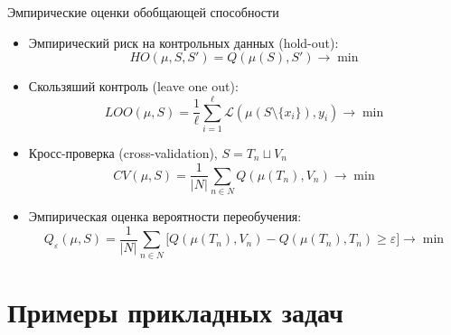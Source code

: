 \documentclass{beamer}
\begin{document}
\begin{frame}{Эмпирические оценки обобщающей способности}
\begin{itemize}
    \item Эмпирический риск на контрольных данных (hold-out):
    $$
        HO(\mu, S, S') = Q(\mu(S), S') \rightarrow \min
    $$
    \item Скользяший контроль (leave one out):
    $$
        LOO(\mu, S) = \frac{1}{\ell}\sum\limits_{i=1}^{\ell}\mathscr{L}(\mu(S\setminus \{x_i\}), y_i) \rightarrow \min
    $$
    \item Кросс-проверка (cross-validation), $S = T_n \sqcup V_n$
    $$
        CV(\mu, S) = \frac{1}{|N|}\sum\limits_{n \in N} Q(\mu(T_n), V_n) \rightarrow \min
    $$
    \item Эмпирическая оценка вероятности переобучения:
    $$
    Q_{\varepsilon}(\mu, S) = \frac{1}{|N|}\sum\limits_{n \in N}\lbrack Q(\mu(T_n), V_n) - Q(\mu(T_n), T_n) \ge \varepsilon \rbrack \rightarrow \min
    $$
\end{itemize}
\end{frame}

\section{Примеры прикладных задач}
\end{document}
